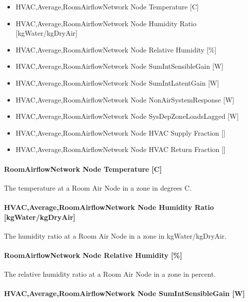 \begin{itemize}
\item
  HVAC,Average,RoomAirflowNetwork Node Temperature {[}C{]}
\item
  HVAC,Average,RoomAirflowNetwork Node Humidity Ratio {[}kgWater/kgDryAir{]}
\item
  HVAC,Average,RoomAirflowNetwork Node Relative Humidity {[}\%{]}
\item
  HVAC,Average,RoomAirflowNetwork Node SumIntSensibleGain {[}W{]}
\item
  HVAC,Average,RoomAirflowNetwork Node SumIntLatentGain {[}W{]}
\item
  HVAC,Average,RoomAirflowNetwork Node NonAirSystemResponse {[}W{]}
\item
  HVAC,Average,RoomAirflowNetwork Node SysDepZoneLoadsLagged {[}W{]}
\item
  HVAC,Average,RoomAirflowNetwork Node HVAC Supply Fraction {[]}
\item
  HVAC,Average,RoomAirflowNetwork Node HVAC Return Fraction {[]}
\end{itemize}

\paragraph{RoomAirflowNetwork Node Temperature {[}C{]}}\label{roomairflownetwork-node-temperature-c-000}

The temperature at a Room Air Node in a zone in degrees C.

\paragraph{HVAC,Average,RoomAirflowNetwork Node Humidity Ratio {[}kgWater/kgDryAir{]}}\label{hvacaverageroomairflownetwork-node-humidity-ratio-kgwaterkgdryair}

The humidity ratio at a Room Air Node in a zone in kgWater/kgDryAir.

\paragraph{RoomAirflowNetwork Node Relative Humidity {[}\%{]}}\label{roomairflownetwork-node-relative-humidity}

The relative humidity ratio at a Room Air Node in a zone in percent.

\paragraph{HVAC,Average,RoomAirflowNetwork Node SumIntSensibleGain {[}W{]}}\label{hvacaverageroomairflownetwork-node-sumintsensiblegain-w}

